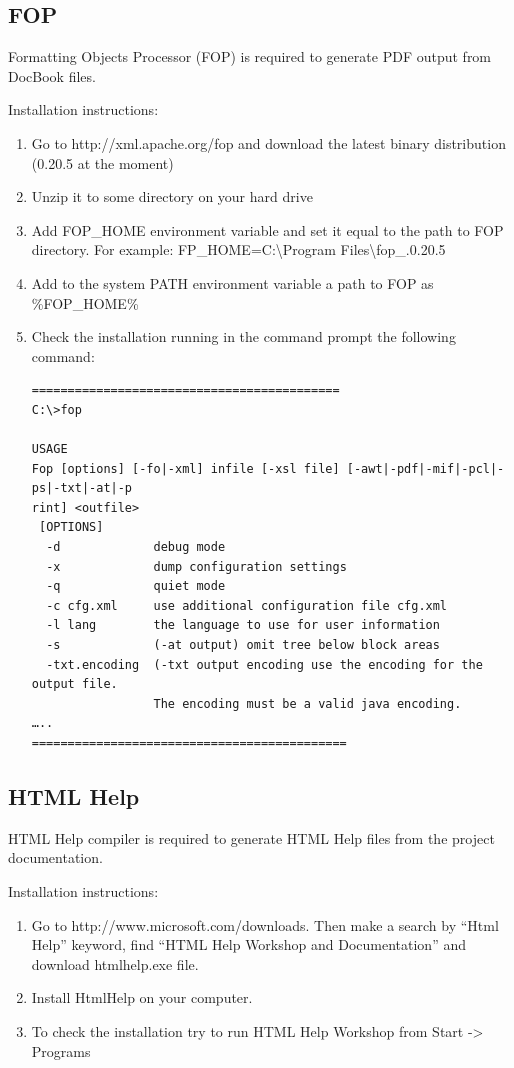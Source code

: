 \documentclass[a4paper,12pt,oneside]{book}
\begin{document}
\subsection{FOP}

Formatting Objects Processor (FOP) is required to generate PDF output from DocBook files.

Installation instructions:
\begin{enumerate}
  \item Go to http://xml.apache.org/fop and download the latest binary distribution (0.20.5 at the moment)
	\item Unzip it to some directory on your hard drive
	\item 
	  Add FOP\_HOME environment variable and set it equal to the path to FOP directory.
		For example: FP\_HOME=C:\textbackslash Program Files\textbackslash fop\_.0.20.5
	\item Add to the system PATH environment variable a path to FOP as \%FOP\_HOME\%
	\item
	  Check the installation running in the command prompt the following command:
		\begin{verbatim}
===========================================
C:\>fop

USAGE
Fop [options] [-fo|-xml] infile [-xsl file] [-awt|-pdf|-mif|-pcl|-ps|-txt|-at|-p
rint] <outfile>
 [OPTIONS]
  -d             debug mode
  -x             dump configuration settings
  -q             quiet mode
  -c cfg.xml     use additional configuration file cfg.xml
  -l lang        the language to use for user information
  -s             (-at output) omit tree below block areas
  -txt.encoding  (-txt output encoding use the encoding for the output file.
                 The encoding must be a valid java encoding.
…..
============================================
    \end{verbatim}
\end{enumerate}

\subsection{HTML Help}
HTML Help compiler is required to generate HTML Help files from the project documentation.

Installation instructions:
\begin{enumerate}
  \item
	  Go to http://www.microsoft.com/downloads.
		Then make a search by “Html Help” keyword, find “HTML Help Workshop and Documentation” and download htmlhelp.exe file.
  \item Install HtmlHelp on your computer.
	\item To check the installation try to run HTML Help Workshop from Start -> Programs
\end{enumerate}
\end{document}
